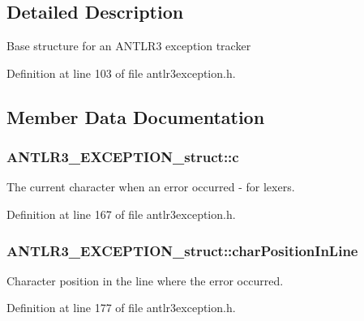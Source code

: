 \subsection{Detailed Description}
Base structure for an A\-N\-T\-L\-R3 exception tracker 

Definition at line 103 of file antlr3exception.\-h.



\subsection{Member Data Documentation}
\hypertarget{struct_a_n_t_l_r3___e_x_c_e_p_t_i_o_n__struct_af1d179f3a7445f6d585c2fe9d141fb9f}{
\subsubsection[{c}]{ A\-N\-T\-L\-R3\-\_\-\-E\-X\-C\-E\-P\-T\-I\-O\-N\-\_\-struct\-::c}}\label{struct_a_n_t_l_r3___e_x_c_e_p_t_i_o_n__struct_af1d179f3a7445f6d585c2fe9d141fb9f}
The current character when an error occurred -\/ for lexers. 

Definition at line 167 of file antlr3exception.\-h.

\hypertarget{struct_a_n_t_l_r3___e_x_c_e_p_t_i_o_n__struct_ad72064f7ff1584daf70684b1352ac2c3}{
\subsubsection[{char\-Position\-In\-Line}]{ A\-N\-T\-L\-R3\-\_\-\-E\-X\-C\-E\-P\-T\-I\-O\-N\-\_\-struct\-::char\-Position\-In\-Line}}\label{struct_a_n_t_l_r3___e_x_c_e_p_t_i_o_n__struct_ad72064f7ff1584daf70684b1352ac2c3}
Character position in the line where the error occurred. 

Definition at line 177 of file antlr3exception.\-h.

